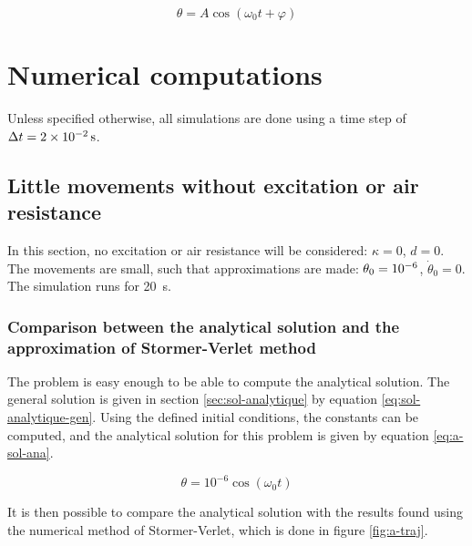 \documentclass[a4paper,12pt,twoside]{article}
\begin{document}
\begin{equation}
	\theta = A\cos\left(\omega_0 t + \varphi\right)
	\label{eq:sol-analytique-gen}
\end{equation}

\section{Numerical computations}

Unless specified otherwise, all simulations are done using a time step of $\Delta t = \SI{2d-2}{\s}$.

\subsection{Little movements without excitation or air resistance}
In this section, no excitation or air resistance will be considered: $\kappa = 0$, $d = 0$.
The movements are small, such that approximations are made: $\theta_0 = \num{d-6}$, $\dot{\theta}_0 = 0$.
The simulation runs for \SI{20}{\second}.

\subsubsection{Comparison between the analytical solution and the approximation of Stormer-Verlet method}
The problem is easy enough to be able to compute the analytical solution.
The general solution is given in section \ref{sec:sol-analytique} by equation \ref{eq:sol-analytique-gen}.
Using the defined initial conditions, the constants can be computed, and the analytical solution for this problem is given by equation \ref{eq:a-sol-ana}.

\begin{equation}
	\theta = 10^{-6}\cos(\omega_0t)
	\label{eq:a-sol-ana}
\end{equation}

It is then possible to compare the analytical solution with the results found using the numerical method of Stormer-Verlet, which is done in figure \ref{fig:a-traj}.
\end{document}
